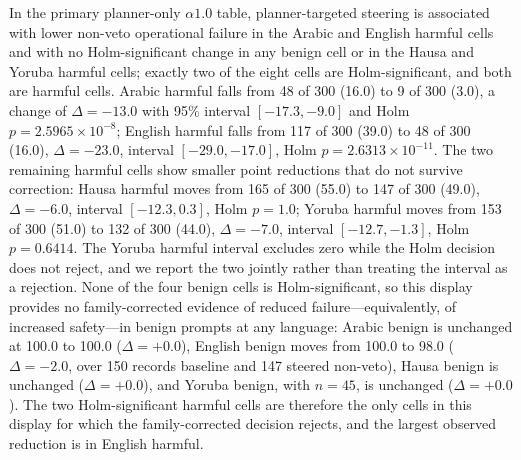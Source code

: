 In the primary planner-only $\alpha1.0$ table, planner-targeted steering is
associated with lower non-veto operational failure in the Arabic and English
harmful cells and with no Holm-significant change in any benign cell or in the
Hausa and Yoruba harmful cells; exactly two of the eight cells are
Holm-significant, and both are harmful cells. Arabic harmful falls from 48 of
300 (16.0) to 9 of 300 (3.0), a change of $\Delta = -13.0$ with 95\% interval
$[-17.3, -9.0]$ and Holm $p = 2.5965\times10^{-8}$; English harmful falls from
117 of 300 (39.0) to 48 of 300 (16.0), $\Delta = -23.0$, interval
$[-29.0, -17.0]$, Holm $p = 2.6313\times10^{-11}$. The two remaining harmful
cells show smaller point reductions that do not survive correction: Hausa
harmful moves from 165 of 300 (55.0) to 147 of 300 (49.0), $\Delta = -6.0$,
interval $[-12.3, 0.3]$, Holm $p = 1.0$; Yoruba harmful moves from 153 of 300
(51.0) to 132 of 300 (44.0), $\Delta = -7.0$, interval $[-12.7, -1.3]$, Holm
$p = 0.6414$. The Yoruba harmful interval excludes zero while the Holm decision
does not reject, and we report the two jointly rather than treating the interval
as a rejection. None of the four benign cells is Holm-significant, so this
display provides no family-corrected evidence of reduced failure---equivalently,
of increased safety---in benign prompts at any language: Arabic benign
is unchanged at 100.0 to 100.0 ($\Delta = +0.0$), English benign moves from
100.0 to 98.0 ($\Delta = -2.0$, over 150 records baseline and 147 steered
non-veto), Hausa benign is unchanged ($\Delta = +0.0$), and Yoruba benign, with
$n = 45$, is unchanged ($\Delta = +0.0$). The two Holm-significant harmful cells
are therefore the only cells in this display for which the family-corrected
decision rejects, and the largest observed reduction is in English harmful.

